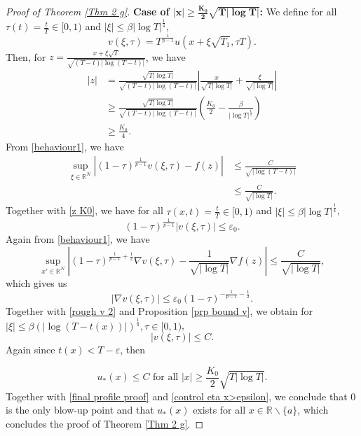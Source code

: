 \documentclass[11pt,a4paper]{article}
\newcommand{\1}{\mathbbm{1}}
\numberwithin{equation}{section}
\newcommand{\numberset}{\mathbb}
\newcommand{\R}{\numberset{R}}
\theoremstyle{remark}
\begin{document}
\begin{proof}[Proof of Theorem \ref{Thm 2 g}]
\textbf{Case of $\mathbf{|x| \geq \frac{K_0}{2}\sqrt{T|\log T|}}$:} We define for all $\tau(t)=\frac{t}{T}\in [0,1)$ and $|\xi|\leq \beta |\log T|^{\frac{1}{4}}$,
$$v(\xi,\tau)=T^{\frac{1}{p-1}}u(x+\xi\sqrt{T_1},\tau T).$$
Then, for $z=\frac{x+\xi\sqrt{T}}{\sqrt{(T-t)|\log(T-t)|}}$, we have
\begin{equation}\label{z K0}
\begin{split}
|z|&=\frac{\sqrt{T|\log T|}}{\sqrt{(T-t)|\log(T-t)|}}\left|\frac{x}{\sqrt{T|\log T|}}+\frac{\xi}{\sqrt{|\log T|}}\right|\\
&\geq \frac{\sqrt{T|\log T|}}{\sqrt{(T-t)|\log(T-t)|}}\left(\frac{K_0}{2}-\frac{\beta}{|\log T|^{\frac{1}{4}}}\right)\\
&\geq \frac{K_0}{4}.
\end{split}
\end{equation}
From \eqref{behaviour1}, we have
\begin{equation*}
\begin{split}
\underset{\xi\in \R^N}{\sup}\left|(1-\tau)^{\frac{1}{p-1}}v(\xi,\tau)-f\left(z\right)\right|&\leq \frac{C}{\sqrt{|\log(T-t)|}}\\
&\leq \frac{C}{\sqrt{|\log T|}}.
\end{split}
\end{equation*}
Together with \eqref{z K0}, we have for all $\tau(x,t)=\frac{t}{T}\in [0,1)$ and $|\xi|\leq \beta |\log T|^{\frac{1}{4}}$,
\begin{equation}\label{rough v 2}
(1-\tau)^{\frac{1}{p-1}}|v(\xi,\tau)|\leq \varepsilon_0.
\end{equation}
Again from \eqref{behaviour1}, we have
\begin{equation*}
\underset{x'\in \R^N}{\sup}\left|(1-\tau)^{\frac{1}{p-1}+\frac{1}{2}}\nabla v(\xi,\tau)-\frac{1}{\sqrt{|\log T|}}\nabla f\left(z\right)\right|\leq \frac{C}{\sqrt{|\log T|}},
\end{equation*}
which gives us 
\begin{equation*}
|\nabla v(\xi,\tau)|\leq \varepsilon_0 (1-\tau)^{-\frac{1}{p-1}-\frac{1}{2}}.
\end{equation*}
Together with \eqref{rough v 2} and Proposition \ref{prp bound v}, we obtain for $|\xi|\leq\beta (|\log(T-t(x))|)^{\frac{1}{4}},\tau\in[0,1)$, 
$$|v(\xi,\tau)|\leq C.$$
Again since $t(x)<T-\varepsilon$, then 

$$u_*(x)\leq C \text{ for all }|x| \geq \frac{K_0}{2}\sqrt{T|\log T|}.$$
Together with \eqref{final profile proof} and \eqref{control eta x>epsilon}, we conclude that $0$ is the only blow-up point and that $u_*(x)$ exists for all $x\in \R\backslash \{a\}$, which concludes the proof of Theorem \ref{Thm 2 g}.
\end{proof}
\end{document}
